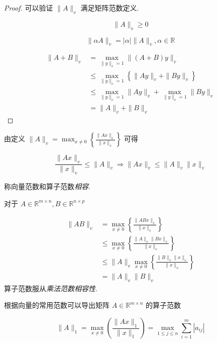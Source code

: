 \begin{proof}
    可以验证 $ \|A\|_{v} $ 满足矩阵范数定义. 

    $$ \|A\|_{v} \geq 0 $$

    $$ \|\alpha A\|_{v}=|\alpha|\|A\|_{v}, \alpha \in \mathbb{R} $$

    $$\begin{aligned}
        \|A+B\|_{v} &=\max _{\|y\|_{v}=1}\|(A+B) y\|_{v} \\
        &\leq \max _{\|y\|_{v}=1}\left\{\|A y\|_{v}+\|B y\|_{v}\right\} \\
        & \leq \max _{\|y\|_{v}=1}\|A y\|_{v}+\max _{\|y\|_{v}=1}\|B y\|_{v} \\
        & =\|A\|_{v}+\|B\|_{v}
    \end{aligned}$$

\end{proof}

由定义 $ \|A\|_{v}=\max _{x \neq 0}\left\{\frac{\|A x\|_{v}}{\|x\|_{v}}\right\} $ 可得

\begin{definition}[向量范数和算子范数相容]
    $$ \frac{\|A x\|_{v}}{\|x\|_{v}} \leq\|A\|_{v} \Rightarrow\|A x\|_{v} \leq\|A\|_{v}\|x\|_{v} $$

    称向量范数和算子范数\textit{相容}. 
\end{definition}

\begin{theorem}[算子范数服从乘法范数相容性]
   对于 $ A \in \mathbb{R}^{m \times n}, B \in \mathbb{R}^{n \times p} $

    $$\begin{aligned}
        \|A B\|_{v} &=\max _{x \neq 0}\left\{\frac{\|A B x\|_{v}}{\|x\|_{v}}\right\} \\
        & \leq \max _{x \neq 0}\left\{\frac{\|A\|_{v}\|B x\|_{v}}{\|x\|_{v}}\right\} \\
        & \leq\|A\|_{v} \max _{x \neq 0}\left\{\frac{\|B\|_{v}\|x\|_{v}}{\|x\|_{v}}\right\} \\
        & =\|A\|_{v}\|B\|_{v}
    \end{aligned}$$
    算子范数服从\textit{乘法范数相容性}.
\end{theorem}

根据向量的常用范数可以导出矩阵 $ A \in \mathbb{R}^{m \times n} $ 的算子范数

\begin{definition}[$A$的列范数]
    $$ \|A\|_{1}=\max _{x \neq 0}\left(\frac{\|A x\|_{1}}{\|x\|_{1}}\right)=\max _{1 \leq j \leq n} \sum_{i=1}^{m}\left|a_{i j}\right| $$
\end{definition}

